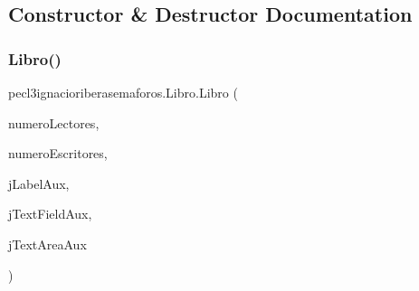 \subsection{Constructor \& Destructor Documentation}
\mbox{\label{classpecl3ignacioriberasemaforos_1_1_libro_a9ed8398ba1fbcf45b74e0d73af9a0831}} 
\subsubsection{\texorpdfstring{Libro()}{Libro()}}
{\footnotesize\ttfamily pecl3ignacioriberasemaforos.\+Libro.\+Libro (\begin{DoxyParamCaption}\item[{int}]{numero\+Lectores,  }\item[{int}]{numero\+Escritores,  }\item[{javax.\+swing.\+J\+Label}]{j\+Label\+Aux,  }\item[{javax.\+swing.\+J\+Text\+Field}]{j\+Text\+Field\+Aux,  }\item[{javax.\+swing.\+J\+Text\+Area}]{j\+Text\+Area\+Aux }\end{DoxyParamCaption})\hspace{0.3cm}{\ttfamily [inline]}}


